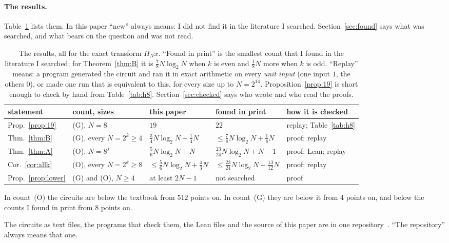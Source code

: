 \documentclass[10pt]{article}
\theoremstyle{remark}
\newcommand{\cntG}{\textup{(G)}}
\newcommand{\cntO}{\textup{(O)}}
\renewcommand{\lg}{\log_2}
\begin{document}
\paragraph{The results.}
Table~\ref{tab:results} lists them. In this paper ``new'' always means: I did not find it in the literature
I searched. Section~\ref{sec:found} says what was searched, and what bears on the question and was not read.

\begin{table}[ht]
\centering
\small
\begin{tabular}{@{}lllll@{}}
\toprule
statement & count, sizes & this paper & found in print & how it is checked\\
\midrule
Prop.~\ref{prop:19} & \cntG, $N=8$ & $19$ & $22$ & replay; Table~\ref{tab:h8}\\
Thm.~\ref{thm:B} & \cntG, every $N=2^k\ge 4$ & $\tfrac34N\lg N+\tfrac14N$ & $\le\tfrac78N\lg N+\tfrac18N$ \cite{CFL}
   & proof; replay\\
Thm.~\ref{thm:A} & \cntO, $N=8^j$ & $\tfrac56N\lg N+N$ & $\tfrac{23}{24}N\lg N+N-1$ \cite{AR}
   & proof; Lean; replay\\
Cor.~\ref{cor:allk} & \cntO, every $N=2^k\ge 8$ & $\le\tfrac56N\lg N+\tfrac43N$ & $\le\tfrac{23}{24}N\lg N+\tfrac{13}{12}N$ \cite{AR}
   & proof; replay\\
Prop.~\ref{prop:lower} & \cntG{} and \cntO, $N\ge 4$ & at least $2N-1$ & not searched & proof\\
\bottomrule
\end{tabular}
\caption{The results, all for the exact transform $H_Nx$. ``Found in print'' is the smallest count
that I found in the literature I searched; for Theorem~\ref{thm:B} it is $\tfrac78N\lg N$ when $k$ is even
and $\tfrac18N$ more when $k$ is odd. ``Replay'' means: a program generated the circuit and ran it in
exact arithmetic on every \emph{unit input} (one input $1$, the others $0$), or made one run that is
equivalent to this, for every size up to $N=2^{14}$. Proposition~\ref{prop:19} is short enough to check by
hand from Table~\ref{tab:h8}. Section~\ref{sec:checked} says who wrote and who read the proofs.}
\label{tab:results}
\end{table}

In count~\cntO{} the circuits are below the textbook from $512$ points on. In count~\cntG{} they are below it from
$4$ points on, and below the counts I found in print from $8$ points on.

The circuits as text files, the programs that check them, the Lean files and the source of this paper are in
one repository~\cite{Repo}. ``The repository'' always means that one.
\end{document}

